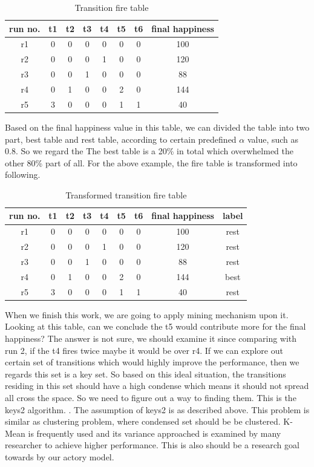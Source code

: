 \documentclass{sig-alternate}
\begin{document}
\begin{table}[h]
\centering
\caption{Transition fire table }
\begin{tabular}{|c|c|c|c|c|c|c|c|}\hline
run no.& t1 & t2 & t3 & t4 & t5 &t6 &final happiness \\
\hline
r1&0&0&0&0&0&0& 100\\
\hline
r2&0&0&0&1&0&0& 120\\
\hline
r3&0&0&1&0&0&0& 88\\
\hline
r4&0&1&0&0&2&0& 144\\
\hline
r5&3&0&0&0&1&1& 40\\
\hline
\end{tabular}
\end{table}

Based on the final happiness value in this table, we can divided the table into two part, best table and rest table, according to certain predefined $\alpha$ value, such as 0.8. So we regard the The best table is a 20\% in total which overwhelmed the other 80\% part of all.  For the above example, the fire table is transformed into following.
 \begin{table}[h]
\centering
\caption{Transformed transition fire table }
\begin{tabular}{|c|c|c|c|c|c|c|c|c|}\hline
run no.&t1 & t2 & t3 & t4 & t5 &t6 &final happiness &label\\
\hline
r1&0&0&0&0&0&0& 100&rest\\
\hline
r2&0&0&0&1&0&0& 120&rest\\
\hline
r3&0&0&1&0&0&0& 88& rest\\
\hline
r4&0&1&0&0&2&0& 144&best\\
\hline
r5&3&0&0&0&1&1& 40&rest\\
\hline
\end{tabular}
\end{table}

When we finish this work, we are going to apply mining mechanism upon it.  Looking at this table, can we conclude the t5 would contribute more for the final happiness? The answer is not sure, we should examine it since comparing with run 2, if the t4 fires twice maybe it would be over r4.  If we can explore out certain set of transitions which would highly improve the performance, then we regards this set is a key set.  So based on this ideal situation, the transitions residing in this set should have a high condense which means it should not spread all cross the space.  So we need to figure out a way to finding them.  This is the keys2 algorithm. \cite{gay09keys}.  The assumption of keys2 is as described above. This problem is similar as clustering problem, where condensed set should be be clustered. K-Mean \cite{kmean} is frequently used and its variance approached is examined by many researcher to achieve higher performance.  This is also should be a research goal towards by our actory model. \\
\end{document}
